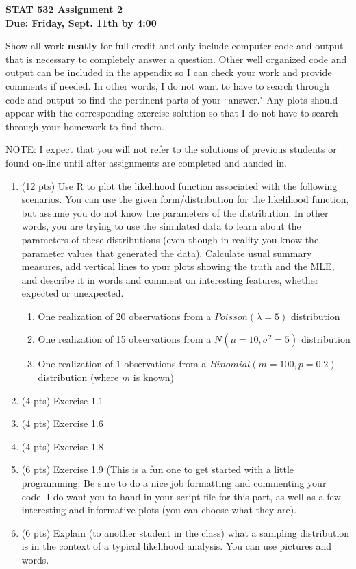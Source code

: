 \documentclass[12pt]{article}
\begin{document}
\begin{center}
\bfseries\Large STAT 532 Assignment 2\\
  Due: Friday, Sept. 11th by 4:00
\end{center}
\vspace{0.25cm}


\noindent Show all work {\bf neatly} for full credit and only include computer code and output that is necessary to completely answer a question.  Other well organized code and output can be included in the appendix so I can check your work and provide comments if needed.  In other words, I do not want to have to search through code and output to find the pertinent parts of your ``answer."  Any plots should appear with the corresponding exercise solution so that I do not have to search through your homework to find them.

\vspace{0.5cm}

\noindent NOTE:  I expect that you will not refer to the solutions of previous students or found on-line until after assignments are completed and handed in.

\begin{enumerate}
  
  \item (12 pts) Use R to plot the likelihood function associated with the following scenarios.  You can use the given form/distribution for the likelihood function, but assume you do not know the parameters of the distribution.  In other words, you are trying to use the simulated data to learn about the parameters of these distributions (even though in reality you know the parameter values that generated the data).  Calculate usual summary measures, add vertical lines to your plots showing the truth and the MLE, and describe it in words and comment on interesting features, whether expected or unexpected.
     \begin{enumerate}
        \item One realization of 20 observations from a $Poisson(\lambda=5)$ distribution
        \item One realization of 15 observations from a $N(\mu=10, \sigma^{2}=5)$ distribution
				\item One realization of 1 observations from a $Binomial(m=100, p=0.2)$ distribution (where $m$ is known)
     \end{enumerate}
  
  \item (4 pts) Exercise 1.1
  \item (4 pts) Exercise 1.6
  \item (4 pts) Exercise 1.8
  \item (6 pts) Exercise 1.9 (This is a fun one to get started with a little programming.  Be sure to do a nice job formatting and commenting your code.  I do want you to hand in your script file for this part, as well as a few interesting and informative plots (you can choose what they are).
  \item (6 pts) Explain (to another student in the class) what a sampling distribution is in the context of a typical likelihood analysis.  You can use pictures and words.
  \end{enumerate}
  
\end{document}

